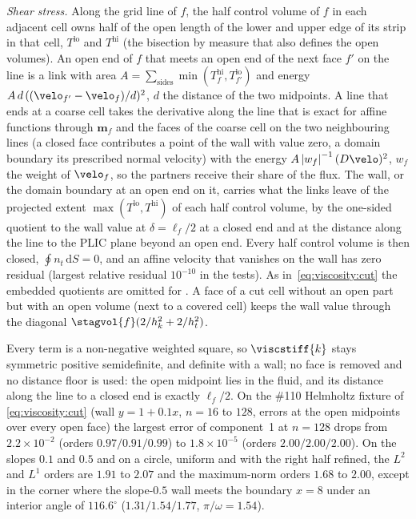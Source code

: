 \emph{Shear stress.} Along the grid line of $f$, the half control volume of
$f$ in each adjacent cell owns half of the open length of the lower and upper
edge of its strip in that cell, $T^{\mathrm{lo}}$ and $T^{\mathrm{hi}}$ (the
bisection by measure that also defines the open volumes). An open end of $f$
that meets an open end of the next face $f'$ on the line is a link with
area $A=\sum_{\text{sides}}\min(T^{\mathrm{hi}}_f,T^{\mathrm{lo}}_{f'})$ and
energy $A\,d\,((\velo_{f'}-\velo_f)/d)^2$, $d$ the distance of the two
midpoints. A line that ends at a coarse cell takes the derivative along the
line that is exact for affine functions through $\mathbf m_f$ and the faces of
the coarse cell on the two neighbouring lines (a closed face contributes a
point of the wall with value zero, a domain boundary its prescribed normal
velocity) with the energy $A\abs{w_f}^{-1}(D\velo)^2$, $w_f$ the weight of
$\velo_f$, so the partners receive their share of the flux. The wall, or the
domain boundary at an open end on it, carries what the links leave of the
projected extent $\max(T^{\mathrm{lo}},T^{\mathrm{hi}})$ of each half control
volume, by the one-sided quotient to the wall value at $\delta=\ell_f/2$ at a
closed end and at the distance along the line to the PLIC plane beyond an open
end. Every half control volume is then closed, $\oint n_t\,\mathrm dS=0$, and
an affine velocity that vanishes on the wall has zero residual (largest
relative residual $10^{-10}$ in the tests). As in~\cref{eq:viscosity:cut} the
embedded quotients are omitted for . A face of a cut cell
without an open part but with an open volume (next to a covered cell) keeps the
wall value through the diagonal $\stagvol{f}(2/h_k^2+2/h_t^2)$.

Every term is a non-negative weighted square, so $\viscstiff{k}$ stays
symmetric positive semidefinite, and definite with a wall; no face is removed
and no distance floor is used: the open midpoint lies in the fluid, and its
distance along the line to a closed end is exactly $\ell_f/2$. On the \#110
Helmholtz fixture of \cref{eq:viscosity:cut} (wall $y=1+0.1x$, $n=16$ to
$128$, errors at the open midpoints over every open face) the largest error
of component~1 at $n=128$ drops from $2.2\times10^{-2}$ (orders
$0.97/0.91/0.99$) to $1.8\times10^{-5}$ (orders $2.00/2.00/2.00$). On the
slopes $0.1$ and $0.5$ and on a circle, uniform and with the right half
refined, the $L^2$ and $L^1$ orders are $1.91$ to $2.07$ and the maximum-norm
orders $1.68$ to $2.00$, except in the corner where the slope-$0.5$ wall
meets the boundary $x=8$ under an interior angle of $116.6^\circ$
($1.31/1.54/1.77$, $\pi/\omega=1.54$).

